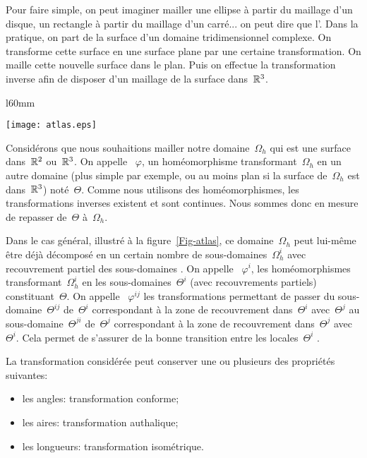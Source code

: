 Pour faire simple, on peut imaginer mailler une ellipse à partir du maillage d'un disque, un rectangle à partir du maillage d'un carré... on peut dire que l'.
Dans la pratique, on part de la surface d'un domaine tridimensionnel complexe. On transforme cette surface en une surface plane par une certaine transformation. On maille cette nouvelle surface dans le plan. Puis on effectue la transformation inverse afin de disposer d'un maillage de la surface dans~$\mathbb R^3$.

\ifVersionDuDocEstVincent\medskip\else\newpage\fi
\begin{wrapfigure}{l}{60mm}
\begin{center}
\texttt{[image: atlas.eps]}
\end{center}
\caption{Domaines et transformations}\label{Fig-atlas}
\end{wrapfigure}
Considérons que nous souhaitions mailler notre domaine~$\Omega_h$ qui est une surface dans~$\mathbb R^2$ ou~$\mathbb R^3$.
On appelle ~$\varphi$, un homéomorphisme transformant~$\Omega_h$ en un autre domaine (plus simple par exemple, ou au moins plan si la surface de~$\Omega_h$ est dans~$\mathbb R^3$) noté~$\Theta$.
Comme nous utilisons des homéomorphismes, les transformations inverses existent et sont continues. Nous sommes donc en mesure de repasser de~$\Theta$ à~$\Omega_h$.

Dans le cas général, illustré à la figure~\ref{Fig-atlas}, ce domaine~$\Omega_h$ peut lui-même être déjà décomposé en un certain nombre de sous-domaines~$\Omega_h^i$ avec recouvrement partiel des sous-domaines .
On appelle ~$\varphi^i$, les homéomorphismes transformant~$\Omega_h^i$ en les sous-domaines~$\Theta^i$ (avec recouvrements partiels) constituant~$\Theta$.
On appelle ~$\varphi^{ij}$ les transformations permettant de passer du sous-domaine~$\Theta^{ij}$ de~$\Theta^i$ correspondant à la zone de recouvrement dans~$\Theta^i$ avec~$\Theta^j$ au sous-domaine~$\Theta^{ji}$ de~$\Theta^j$ correspondant à la zone de recouvrement dans~$\Theta^j$ avec~$\Theta^i$. Cela permet de s'assurer de la bonne transition entre les  locales~$\Theta^{i}$ .

\medskip
La transformation considérée peut conserver une ou plusieurs des propriétés suivantes:
\begin{itemize}
   \item les angles: transformation conforme;
   \item les aires: transformation authalique;
   \item les longueurs: transformation isométrique.
\end{itemize}

